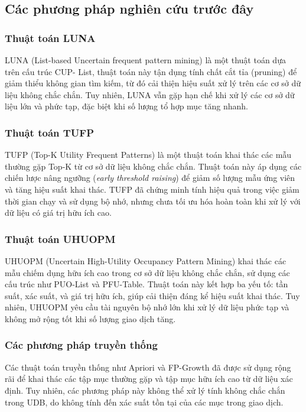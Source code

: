 \documentclass[conference]{IEEEtran}
\begin{document}
\subsection{Các phương pháp nghiên cứu trước đây}

\subsubsection{Thuật toán LUNA}
LUNA (List-based Uncertain frequent pattern mining) là một thuật toán dựa trên cấu trúc CUP- List, thuật toán này tận dụng tính chất cắt tỉa (pruning) để giảm thiểu không gian tìm kiếm, từ đó cải thiện hiệu suất xử lý trên các cơ sở dữ liệu không chắc chắn. Tuy nhiên, LUNA vẫn gặp hạn chế khi xử lý các cơ sở dữ liệu lớn và phức tạp, đặc biệt khi số lượng tổ hợp mục tăng nhanh.

\subsubsection{Thuật toán TUFP}
TUFP (Top-K Utility Frequent Patterns) là một thuật toán khai thác các mẫu thường gặp Top-K từ cơ sở dữ liệu không chắc chắn. Thuật toán này áp dụng các chiến lược nâng ngưỡng (\textit{early threshold raising}) để giảm số lượng mẫu ứng viên và tăng hiệu suất khai thác. TUFP đã chứng minh tính hiệu quả trong việc giảm thời gian chạy và sử dụng bộ nhớ, nhưng chưa tối ưu hóa hoàn toàn khi xử lý với dữ liệu có giá trị hữu ích cao.

\subsubsection{Thuật toán UHUOPM} \cite{chen2020}
UHUOPM (Uncertain High-Utility Occupancy Pattern Mining) khai thác các mẫu chiếm dụng hữu ích cao trong cơ sở dữ liệu không chắc chắn, sử dụng các cấu trúc như PUO-List và PFU-Table. Thuật toán này kết hợp ba yếu tố: tần suất, xác suất, và giá trị hữu ích, giúp cải thiện đáng kể hiệu suất khai thác. Tuy nhiên, UHUOPM yêu cầu tài nguyên bộ nhớ lớn khi xử lý dữ liệu phức tạp và không mở rộng tốt khi số lượng giao dịch tăng.

\subsubsection{Các phương pháp truyền thống}
Các thuật toán truyền thống như Apriori và FP-Growth đã được sử dụng rộng rãi để khai thác các tập mục thường gặp và tập mục hữu ích cao từ dữ liệu xác định. Tuy nhiên, các phương pháp này không thể xử lý tính không chắc chắn trong UDB, do không tính đến xác suất tồn tại của các mục trong giao dịch.
\end{document}
